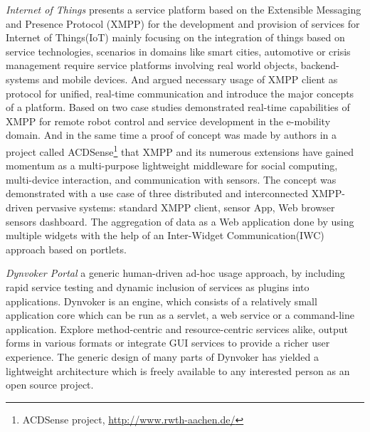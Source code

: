 	\emph{Internet of Things}\cite{bendel2013service} presents a service platform based on the Extensible Messaging and Presence Protocol (XMPP) for the development and provision of services for Internet of Things(IoT) mainly focusing on the integration of things based on service technologies, scenarios in domains like smart cities, automotive or crisis management require service platforms involving real world objects, backend-systems and mobile devices. And argued necessary usage of XMPP client as protocol for unified, real-time communication and introduce the major concepts of a platform. Based on two case studies demonstrated real-time capabilities of XMPP for remote robot control and service development in the e-mobility domain. And in the same time a proof of concept was made by authors in a project called ACDSense\footnote{ACDSense project, \url{http://www.rwth-aachen.de/}} that XMPP and its numerous extensions have gained momentum as a multi-purpose lightweight middleware for social computing, multi-device interaction, and communication with sensors. The concept was demonstrated with a use case of three distributed and interconnected XMPP-driven pervasive systems: standard XMPP client, sensor App, Web browser sensors dashboard. The aggregation of data as a Web application done by using multiple widgets with the help of an Inter-Widget Communication(IWC) approach based on portlets\cite{ACDSense}. 

	\emph{Dynvoker Portal}\cite{spillner2008ad} a generic human-driven ad-hoc usage approach, by including rapid service testing and dynamic inclusion of services as plugins into applications. Dynvoker is an engine, which consists of a relatively small application core which can be run as a servlet, a web service or a command-line application. Explore method-centric and resource-centric services alike, output forms in various formats or integrate GUI services to provide a richer user experience. The generic design of many parts of Dynvoker has yielded a lightweight architecture which is freely available to any interested person as an open source project.

